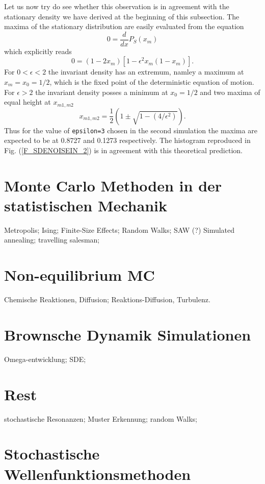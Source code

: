 Let us now try do see whether this observation is in agreement 
with the stationary density we have derived at the beginning of 
this subsection. The maxima of the stationary distribution are 
easily evaluated from the equation
\begin{equation*}
0 = \frac{d}{dx}P_S(x_m)
\end{equation*}
which explicitly reads
\begin{equation*}
0= (1-2x_m) [1- \epsilon^2 x_m (1-x_m) ].
\end{equation*}
For $0 < \epsilon <2$ the invariant density has an extremum, 
namley a maximum at $x_m =x_0= 1/2$, which is the fixed point of the 
deterministic equation of motion. For $\epsilon > 2$ the invariant
density posses a minimum at $x_0 =1/2$ and two maxima of equal 
height at $x_{m1,m2}$
\begin{equation*}
x_{m1,m2} = \frac{1}{2} \left(1 \pm  \sqrt{1 - (4/\epsilon^2)} 
\right).
\end{equation*}
Thus for the value of \texttt{epsilon=3} chosen in the second 
simulation the maxima are expected  to be at 0.8727 and 0.1273 
respectively. The histogram reproduced in Fig. (\ref{F_SDENOISEIN_2})
is in agreement with this theoretical prediction.








\chapter{Monte Carlo Methoden in der statistischen Mechanik}
Metropolis; Ising; Finite-Size Effects; Random Walks; SAW (?)
Simulated annealing; travelling salesman;

\chapter{Non-equilibrium MC}
Chemische Reaktionen, Diffusion; Reaktions-Diffusion, Turbulenz.

\chapter{Brownsche Dynamik Simulationen}
Omega-entwicklung; SDE;


\chapter{Rest}
stochastische Resonanzen; Muster Erkennung; random Walks;

\chapter{Stochastische Wellenfunktionsmethoden}
